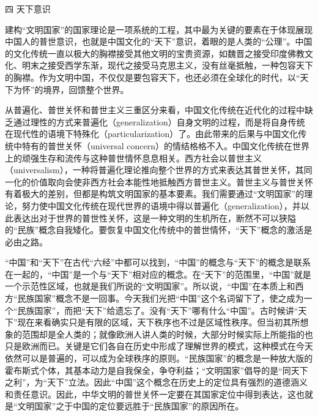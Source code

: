 \documentclass[UTF8, 12pt, a4paper]{ctexrep}
\begin{document}
四 天下意识

建构“文明国家”的国家理论是一项系统的工程，其中最为关键的要素在于体现展现中国人的普世意识，也就是中国文化的“天下”意识，着眼的是人类的“公理”。中国的文化传统一直以极大的胸襟接受其他文明的宝贵资源，如魏晋之接受印度佛教文化、明末之接受西学东渐，现代之接受马克思主义，没有丝毫抵触，一种包容天下的胸襟。作为文明中国，不仅仅是要包容天下，也还必须在全球化的时代，以“天下为怀”的境界，回馈整个世界。

从普遍化、普世关怀和普世主义三重区分来看，中国文化传统在近代化的过程中缺乏通过理性的方式来普遍化（generalization）自身文明的过程，而是将自身传统在现代性的语境下特殊化（particularization）了。由此带来的后果与中国文化传统中特有的普世关怀（universal concern）的情结格格不入。中国文化传统在世界上的顽强生存和流传与这种普世情怀息息相关。西方社会以普世主义（universalism），一种将普遍化理论推向整个世界的方式来表达其普世关怀，其同一化的价值取向会使非西方社会本能性地抵触西方普世主义。普世主义与普世关怀有着极大的差别，但都是构筑文明国家的基本要素。我们需要通过“文明国家”的理论，努力使中国文化传统在现代世界的语境中得以普遍化（generalization），并以此表达出对于世界的普世性关怀，这是一种文明的生机所在，断然不可以狭隘的“民族”概念自我矮化。要恢复中国文化传统中的普世情怀，“天下”概念的激活是必由之路。

“中国”和“天下”在古代“六经”中都可以找到，“中国”的概念与“天下”的概念是联系在一起的，“中国”是一个与“天下”相对应的概念。在“天下”的范围里，“中国”就是一个示范性区域，也就是我们所说的“文明国家”。所以说，“中国”在本质上和西方“民族国家”概念不是一回事。今天我们光把“中国”这个名词留下了，使之成为一个“民族国家”，而把“天下”给遗忘了。没有“天下”哪有什么“中国”。古时候讲“天下”现在来看确实只是有限的区域，天下秩序也不过是区域性秩序。但当初其所想象的范围却是全人类的；就像欧洲人讲人类的时候，大部分时候实际上所能指的也只是欧洲而已。关键是它们各自在历史中形成了理解世界的模式，这种模式在今天依然可以是普遍的，可以成为全球秩序的原则。“民族国家”的概念是一种放大版的霍布斯式个体，其基本动力是自我保全，争夺利益；“文明国家”倡导的是“同天下之利”，为“天下”立法。因此“中国”这个概念在历史上的定位具有强烈的道德涵义和责任意识。因此，中华文明的普世关怀一定要在其国家定位中得到表达，这也就是“文明国家”之于中国的定位要远胜于“民族国家”的原因所在。
\end{document}
